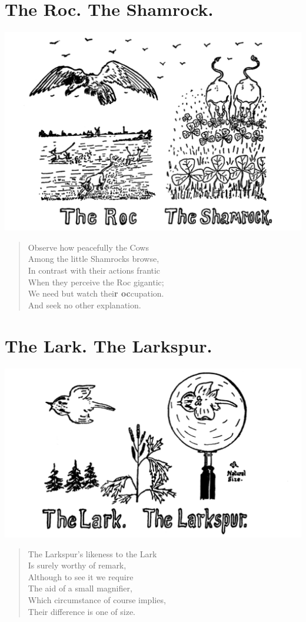 \documentclass[letterpaper, 10pt, openany]{memoir}
\begin{document}
\chapter{The Roc. The Shamrock.}
\includegraphics[width=1\textwidth]{f-p25.png}
\vspace{\onelineskip}
\begin{verse}\huge
Observe how peacefully the Cows\\
Among the little Shamrocks browse,\\
In contrast with their actions frantic\\
When they perceive the Roc gigantic;\\
We need but watch thei\textbf{r oc}cupation.\\
And seek no other explanation.\\
\end{verse}

\chapter{The Lark. The Larkspur.}
\includegraphics[width=1\textwidth]{f-p26.png}
\vspace{\onelineskip}
\begin{verse}\huge
The Larkspur's likeness to the Lark\\
Is surely worthy of remark,\\
Although to see it we require\\
The aid of a small magnifier,\\
Which circumstance of course implies,\\
Their difference is one of size.\\
\end{verse}
\end{document}
